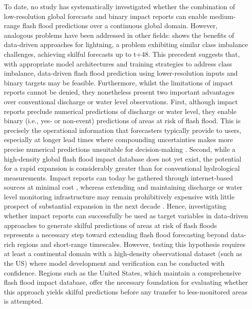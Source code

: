To  date, no study has systematically investigated whether the combination of low-resolution global forecasts and binary impact reports can enable medium-range flash flood predictions over a continuous global domain. However, analogous problems have been addressed in other fields: \citet{Cavaiola_2024} shows the benefits of data-driven approaches for lightning, a problem exhibiting similar class imbalance challenges, achieving skilful forecasts up to t+48. This precedent suggests that, with appropriate model architectures and training strategies to address class imbalance, data-driven flash flood prediction using lower-resolution inputs and binary targets may be feasible. Furthermore, whilst the limitations of impact reports cannot be denied, they nonetheless present two important advantages over conventional discharge or water level observations. First, although impact reports preclude numerical predictions of discharge or water level, they enable binary (i.e., yes- or non-event) predictions of areas at risk of flash flood. This is precisely the operational information that forecasters typically provide to users, especially at longer lead times where compounding uncertainties makes more precise numerical predictions unsuitable for decision-making \citep{Zanchetta_2020}. Second, while a high-density global flash flood impact database does not yet exist, the potential for a rapid expansion is considerably greater than for conventional hydrological measurements. Impact reports can today be gathered through internet-based sources at minimal cost \citep{Wyatt_2023, Wyatt_2024a}, whereas extending and maintaining discharge or water level monitoring infrastructure may remain prohibitively expensive with little prospect of substantial expansion in the next decade \citep{McCabe_2017, Andrews_2024, Nasta_2025}. Hence, investigating whether impact reports can successfully be used as target variables in data-driven approaches to generate skilful predictions of areas at risk of flash floods represents a necessary step toward extending flash flood forecasting beyond data-rich regions and short-range timescales. However, testing this hypothesis requires at least a continental domain with a high-density observational dataset (such as the US) where model development and verification can be conducted with confidence. Regions such as the United States, which maintain a comprehensive flash flood impact database, offer the necessary foundation for evaluating whether this approach yields skilful predictions before any transfer to less-monitored areas is attempted.

